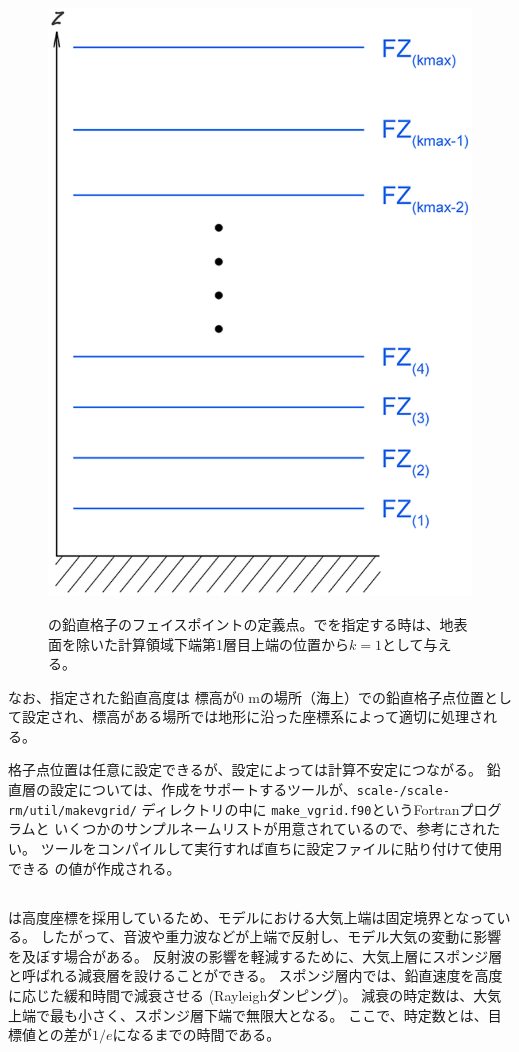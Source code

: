 \begin{figure}[tb]
\begin{center}
  \includegraphics[width=0.4\hsize]{./figure/verticalface.eps}\\
  \caption{\scalerm の鉛直格子のフェイスポイントの定義点。でを指定する時は、地表面を除いた計算領域下端第1層目上端の位置から$k=1$として与える。}
  \label{fig:scale_grid}
\end{center}
\end{figure}

なお、指定された鉛直高度は
標高が0 mの場所（海上）での鉛直格子点位置として設定され、標高がある場所では地形に沿った座標系によって適切に処理される。


格子点位置は任意に設定できるが、設定によっては計算不安定につながる。
鉛直層の設定については、作成をサポートするツールが、\texttt{scale-\version/scale-rm/util/makevgrid/}
ディレクトリの中に \verb|make_vgrid.f90|というFortranプログラムと
いくつかのサンプルネームリストが用意されているので、参考にされたい。
ツールをコンパイルして実行すれば直ちに設定ファイルに貼り付けて使用できる
の値が作成される。






\subsection{\SubsecRayleighDampingSetting} \label{subsec:raydamp}
\scalerm は高度座標を採用しているため、モデルにおける大気上端は固定境界となっている。
したがって、音波や重力波などが上端で反射し、モデル大気の変動に影響を及ぼす場合がある。
反射波の影響を軽減するために、大気上層にスポンジ層と呼ばれる減衰層を設けることができる。
スポンジ層内では、鉛直速度を高度に応じた緩和時間で減衰させる (Rayleighダンピング)。
減衰の時定数は、大気上端で最も小さく、スポンジ層下端で無限大となる。
ここで、時定数とは、目標値との差が$1/e$になるまでの時間である。


